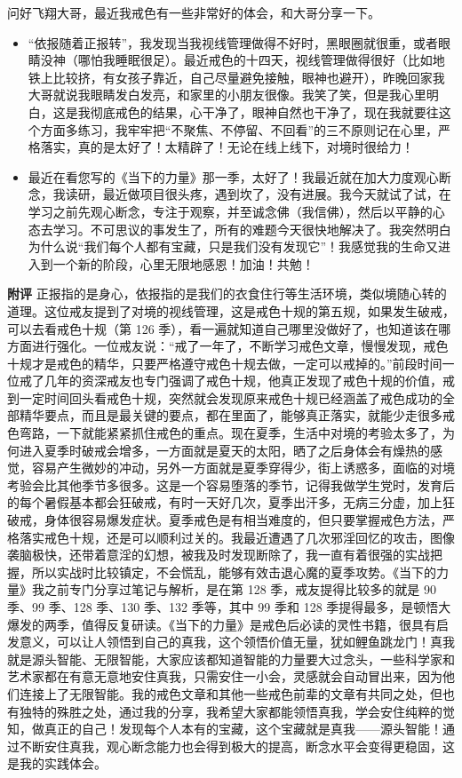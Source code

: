 \begin{case}
    问好飞翔大哥，最近我戒色有一些非常好的体会，和大哥分享一下。\begin{itemize}
        \item “依报随着正报转”，我发现当我视线管理做得不好时，黑眼圈就很重，或者眼睛没神（哪怕我睡眠很足）。最近戒色的十四天，视线管理做得很好（比如地铁上比较挤，有女孩子靠近，自己尽量避免接触，眼神也避开），昨晚回家我大哥就说我眼睛发白发亮，和家里的小朋友很像。我笑了笑，但是我心里明白，这是我彻底戒色的结果，心干净了，眼神自然也干净了，现在我就要往这个方面多练习，我牢牢把“不聚焦、不停留、不回看”的三不原则记在心里，严格落实，真的是太好了！太精辟了！无论在线上线下，对境时很给力！
        \item 最近在看您写的《当下的力量》那一季，太好了！我最近就在加大力度观心断念，我读研，最近做项目很头疼，遇到坎了，没有进展。我今天就试了试，在学习之前先观心断念，专注于观察，并至诚念佛（我信佛），然后以平静的心态去学习。不可思议的事发生了，所有的难题今天很快地解决了。我突然明白为什么说“我们每个人都有宝藏，只是我们没有发现它”！我感觉我的生命又进入到一个新的阶段，心里无限地感恩！加油！共勉！
    \end{itemize}

    \textbf{附评} 正报指的是身心，依报指的是我们的衣食住行等生活环境，类似境随心转的道理。这位戒友提到了对境的视线管理，这是戒色十规的第五规，如果发生破戒，可以去看戒色十规（第 126 季），看一遍就知道自己哪里没做好了，也知道该在哪方面进行强化。一位戒友说：“戒了一年了，不断学习戒色文章，慢慢发现，戒色十规才是戒色的精华，只要严格遵守戒色十规去做，一定可以戒掉的。”前段时间一位戒了几年的资深戒友也专门强调了戒色十规，他真正发现了戒色十规的价值，戒到一定时间回头看戒色十规，突然就会发现原来戒色十规已经涵盖了戒色成功的全部精华要点，而且是最关键的要点，都在里面了，能够真正落实，就能少走很多戒色弯路，一下就能紧紧抓住戒色的重点。现在夏季，生活中对境的考验太多了，为何进入夏季时破戒会增多，一方面就是夏天的太阳，晒了之后身体会有燥热的感觉，容易产生微妙的冲动，另外一方面就是夏季穿得少，街上诱惑多，面临的对境考验会比其他季节多很多。这是一个容易堕落的季节，记得我做学生党时，发育后的每个暑假基本都会狂破戒，有时一天好几次，夏季出汗多，无病三分虚，加上狂破戒，身体很容易爆发症状。夏季戒色是有相当难度的，但只要掌握戒色方法，严格落实戒色十规，还是可以顺利过关的。我最近遭遇了几次邪淫回忆的攻击，图像袭脑极快，还带着意淫的幻想，被我及时发现断除了，我一直有着很强的实战把握，所以实战时比较镇定，不会慌乱，能够有效击退心魔的夏季攻势。《当下的力量》我之前专门分享过笔记与解析，是在第 128 季，戒友提得比较多的就是 90 季、99 季、128 季、130 季、132 季等，其中 99 季和 128 季提得最多，是顿悟大爆发的两季，值得反复研读。《当下的力量》是戒色后必读的灵性书籍，很具有启发意义，可以让人领悟到自己的真我，这个领悟价值无量，犹如鲤鱼跳龙门！真我就是源头智能、无限智能，大家应该都知道智能的力量要大过念头，一些科学家和艺术家都在有意无意地安住真我，只需安住一小会，灵感就会自动冒出来，因为他们连接上了无限智能。我的戒色文章和其他一些戒色前辈的文章有共同之处，但也有独特的殊胜之处，通过我的分享，我希望大家都能领悟真我，学会安住纯粹的觉知，做真正的自己！发现每个人本有的宝藏，这个宝藏就是真我——源头智能！通过不断安住真我，观心断念能力也会得到极大的提高，断念水平会变得更稳固，这是我的实践体会。
\end{case}

